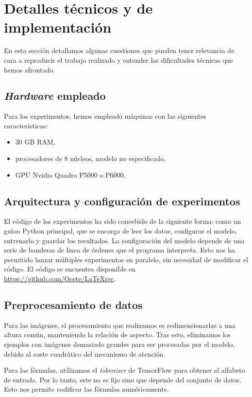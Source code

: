 \documentclass[a4paper, 20pt, dvipsnames]{article}
\begin{document}
\section{Detalles técnicos y de implementación}

En esta sección detallamos algunas cuestiones que pueden tener relevancia de
cara a reproducir el trabajo realizado y entender las dificultades técnicas que
hemos afrontado.

\subsection{\emph{Hardware} empleado}

Para los experimentos, hemos empleado máquinas con las siguientes
características:
\begin{itemize}
\item
  30 GB RAM,
\item
  procesadores de 8 núcleos, modelo no especificado,
\item
  GPU Nvidia Quadro P5000 o P6000.
\end{itemize}

\subsection{Arquitectura y configuración de experimentos}

El código de los experimentos ha sido concebido de la siguiente forma: como un
guion Python principal, que se encarga de leer los datos, configurar el modelo,
entrenarlo y guardar los resultados. La configuración del modelo depende de una
serie de banderas de línea de órdenes que el programa interpreta. Esto nos ha
permitido lanzar múltiples experimentos en paralelo, sin necesidad de modificar
el código. El código se encuentra disponible en
\url{https://github.com/Ocete/LaTeXrec}.

\subsection{Preprocesamiento de datos}

Para las imágenes, el procesamiento que realizamos es redimensionarlas a una
altura común, manteniendo la relación de aspecto. Tras esto, eliminamos los
ejemplos con imágenes demasiado grandes para ser procesadas por el modelo,
debido al coste cuadrático del mecanismo de atención.

Para las fórmulas, utilizamos el \emph{tokenizer} de TensorFlow \cite{tokenizer}
para obtener el alfabeto de entrada. Por lo tanto, este no es fijo sino que
depende del conjunto de datos. Esto nos permite codificar las fórmulas
numéricamente.
\end{document}
